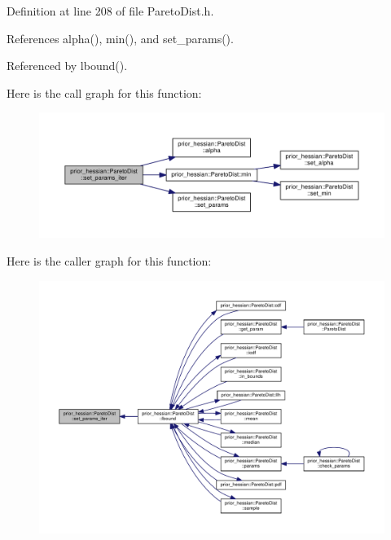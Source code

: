 Definition at line 208 of file Pareto\+Dist.\+h.



References alpha(), min(), and set\+\_\+params().



Referenced by lbound().



Here is the call graph for this function\+:\nopagebreak
\begin{figure}[H]
\begin{center}
\leavevmode
\includegraphics[width=350pt]{classprior__hessian_1_1ParetoDist_abc9e60af487bda1a9ec5f7e55e38682c_cgraph}
\end{center}
\end{figure}




Here is the caller graph for this function\+:\nopagebreak
\begin{figure}[H]
\begin{center}
\leavevmode
\includegraphics[width=350pt]{classprior__hessian_1_1ParetoDist_abc9e60af487bda1a9ec5f7e55e38682c_icgraph}
\end{center}
\end{figure}


